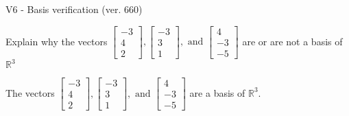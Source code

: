 \begin{exercise}
  \begin{exerciseTitle}V6 - Basis verification (ver. 660)\end{exerciseTitle}
  \begin{exerciseStatement}
    Explain why the vectors \(\left[\begin{array}{r}
-3 \\
4 \\
2
\end{array}\right] , \left[\begin{array}{r}
-3 \\
3 \\
1
\end{array}\right] , \text{ and } \left[\begin{array}{r}
4 \\
-3 \\
-5
\end{array}\right]\) are or are not a basis of \(\mathbb{R}^3\)	


  \end{exerciseStatement}
  \begin{exerciseAnswer}
   The vectors \(\left[\begin{array}{r}
-3 \\
4 \\
2
\end{array}\right] , \left[\begin{array}{r}
-3 \\
3 \\
1
\end{array}\right] , \text{ and } \left[\begin{array}{r}
4 \\
-3 \\
-5
\end{array}\right]\) 
  	 are  a basis of \(\mathbb{R}^3\).
  


  \end{exerciseAnswer}
\end{exercise}